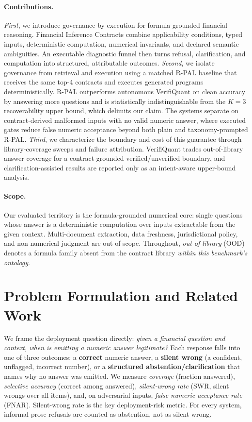 \documentclass[sigconf,anonymous]{acmart}
\begin{document}
\paragraph{Contributions.}
\emph{First}, we introduce governance by execution for formula-grounded financial reasoning.
Financial Inference Contracts combine applicability conditions, typed inputs, deterministic computation, numerical invariants, and declared semantic ambiguities. An executable diagnostic funnel then turns refusal, clarification, and computation into structured, attributable outcomes.
\emph{Second}, we isolate governance from retrieval and execution using a matched R-PAL baseline that receives the same top-4 contracts and executes generated programs deterministically.
R-PAL outperforms autonomous VerifiQuant on clean accuracy by answering more questions and is statistically indistinguishable from the $K{=}3$ recoverability upper bound, which delimits our claim. The systems separate on contract-derived malformed inputs with no valid numeric answer, where executed gates reduce false numeric acceptance beyond both plain and taxonomy-prompted R-PAL.
\emph{Third}, we characterize the boundary and cost of this guarantee through library-coverage sweeps and failure attribution. VerifiQuant trades out-of-library answer coverage for a contract-grounded verified/unverified boundary, and clarification-assisted results are reported only as an intent-aware upper-bound analysis.

\paragraph{Scope.} Our evaluated territory is the formula-grounded numerical core: single questions whose answer is a deterministic computation over inputs extractable from the given context.
Multi-document extraction, data freshness, jurisdictional policy, and non-numerical judgment are out of scope.
Throughout, \emph{out-of-library} (OOD) denotes a formula family absent from the contract library \emph{within this benchmark's ontology}.

\section{Problem Formulation and Related Work}\label{sec:v2problem}
We frame the deployment question directly: \emph{given a financial question and context, when is emitting a numeric answer legitimate?}
Each response falls into one of three outcomes: a \textbf{correct} numeric answer, a \textbf{silent wrong} (a confident, unflagged, incorrect number), or a \textbf{structured abstention/clarification} that names why no answer was emitted.
We measure \emph{coverage} (fraction answered), \emph{selective accuracy} (correct among answered), \emph{silent-wrong rate} (SWR, silent wrongs over all items), and, on adversarial inputs, \emph{false numeric acceptance rate} (FNAR).
Silent-wrong rate is the key deployment-risk metric. For every system, informal prose refusals are counted as abstention, not as silent wrong.
\end{document}
